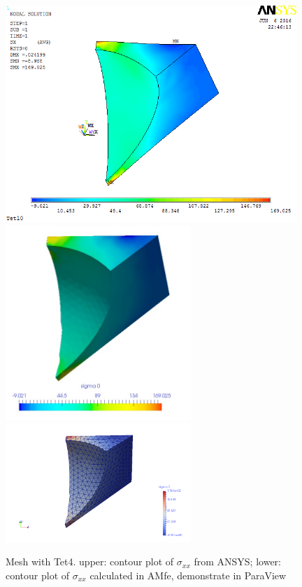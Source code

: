 \begin{figure}[htbp]
	\begin{center}
		\includegraphics[width=11cm,clip]{Tet4Sxx.png} 	
		\includegraphics[width=7cm,clip]{Tet4SxxPD.png} 	
		\includegraphics[width=7cm,clip]{Tet4SxxP.png} 		
		\caption{Mesh with Tet4. upper: contour plot of $\sigma_{xx}$ from ANSYS; lower: contour plot of $\sigma_{xx}$ calculated in AMfe, demonstrate in ParaView} \label{fig: Tet4Sxx}
	\end{center}
\end{figure}
\clearpage 

